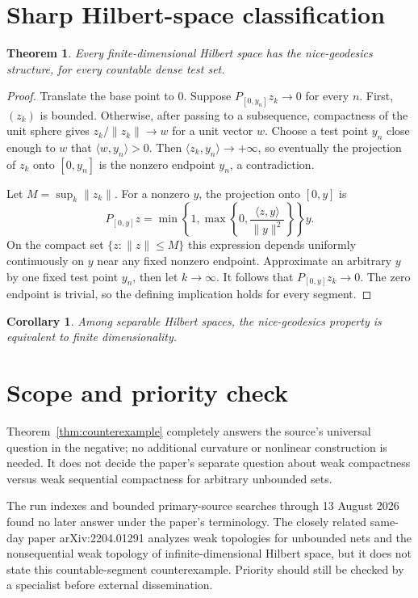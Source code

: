 \documentclass[11pt]{article}
\newtheorem{theorem}{Theorem}
\newtheorem{corollary}{Corollary}
\begin{document}
\section*{Sharp Hilbert-space classification}
\vspace{0.35em}

\begin{theorem}\label{thm:finite}
Every finite-dimensional Hilbert space has the nice-geodesics structure,
for every countable dense test set.
\end{theorem}

\begin{proof}
Translate the base point to $0$.  Suppose
$P_{[0,y_n]}z_k\to0$ for every $n$.  First, $(z_k)$ is bounded.  Otherwise,
after passing to a subsequence, compactness of the unit sphere gives
$z_k/\|z_k\|\to w$ for a unit vector $w$.  Choose a test point $y_n$ close
enough to $w$ that $\langle w,y_n\rangle>0$.  Then
$\langle z_k,y_n\rangle\to+\infty$, so eventually the projection of $z_k$
onto $[0,y_n]$ is the nonzero endpoint $y_n$, a contradiction.

Let $M=\sup_k\|z_k\|$.  For a nonzero $y$, the projection onto $[0,y]$ is
\[
 P_{[0,y]}z=
 \min\!\left\{1,\max\!\left\{0,
 \frac{\langle z,y\rangle}{\|y\|^2}\right\}\right\}y.
\]
On the compact set $\{z:\|z\|\le M\}$ this expression depends uniformly
continuously on $y$ near any fixed nonzero endpoint.  Approximate an arbitrary
$y$ by one fixed test point $y_n$, then let $k\to\infty$.  It follows that
$P_{[0,y]}z_k\to0$.  The zero endpoint is trivial, so the defining implication
holds for every segment.
\end{proof}

\begin{corollary}
Among separable Hilbert spaces, the nice-geodesics property is equivalent to
finite dimensionality.
\end{corollary}

\section*{Scope and priority check}

Theorem~\ref{thm:counterexample} completely answers the source's universal
question in the negative; no additional curvature or nonlinear construction
is needed.  It does not decide the paper's separate question about weak
compactness versus weak sequential compactness for arbitrary unbounded sets.

The run indexes and bounded primary-source searches through 13 August 2026
found no later answer under the paper's terminology.  The closely related
same-day paper arXiv:2204.01291 analyzes weak topologies for unbounded nets and
the nonsequential weak topology of infinite-dimensional Hilbert space, but it
does not state this countable-segment counterexample.  Priority should still
be checked by a specialist before external dissemination.
\end{document}

